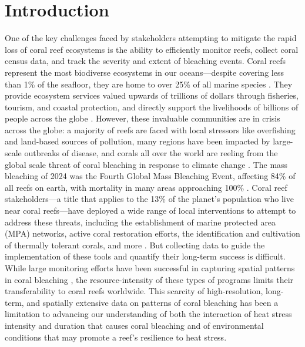 \documentclass[11pt]{elsarticle}
\begin{document}
\section{Introduction}
One of the key challenges faced by stakeholders attempting to mitigate the rapid loss of coral reef ecosystems is the ability to efficiently monitor reefs, collect coral census data, and track the severity and extent of bleaching events. Coral reefs represent the most biodiverse ecosystems in our oceans---despite covering less than 1\% of the seafloor, they are home to over 25\% of all marine species \citep{reakakudla1997}. They provide ecosystem services valued upwards of trillions of dollars through fisheries, tourism, and coastal protection, and directly support the livelihoods of billions of people across the globe \citep{costanza2014,sing2022}. However, these invaluable communities are in crisis across the globe: a majority of reefs are faced with local stressors like overfishing and land-based sources of pollution, many regions have been impacted by large-scale outbreaks of disease, and corals all over the world are reeling from the global scale threat of coral bleaching in response to climate change \citep{burke2011reefs,vega2025, hughes2017}. The mass bleaching of 2024 was the Fourth Global Mass Bleaching Event, affecting 84\% of all reefs on earth, with mortality in many areas approaching 100\% \cite{spady2025,birkart2025}. Coral reef stakeholders---a title that applies to the 13\% of the planet's population who live near coral reefs---have deployed a wide range of local interventions to attempt to address these threats, including the establishment of marine protected area (MPA) networks, active coral restoration efforts, the identification and cultivation of thermally tolerant corals, and more \citep{strain2019, bostrom2020}. But collecting data to guide the implementation of these tools and quantify their long-term success is difficult. While large monitoring efforts have been successful in capturing spatial patterns in coral bleaching \citep{winston2022,rowell2025}, the resource-intensity of these types of programs limits their transferability to coral reefs worldwide. This scarcity of high-resolution, long-term, and spatially extensive data on patterns of coral bleaching has been a limitation to advancing our understanding of both the interaction of heat stress intensity and duration that causes coral bleaching and of environmental conditions that may promote a reef's resilience to heat stress.
\end{document}
